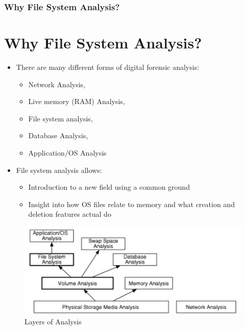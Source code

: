 \documentclass{beamer}
\begin{document}
\begin{frame}[allowframebreaks]
	\frametitle{Why File System Analysis?}
	\section{Why File System Analysis?}
	\begin{itemize}
		\item There are many different forms of digital forensic analysis:
			\begin{itemize}
				\item Network Analysis,
				\item Live memory (RAM) Analysis, 
				\item File system analysis, 
				\item Database Analysis,
				\item Application/OS Analysis
			\end{itemize}
			\item File system analysis allows:
			\begin{itemize}
				\item Introduction to a new field using a common ground
				\item Insight into how OS files relate to memory and what creation and deletion features actual do
			\end{itemize}
	\end{itemize}
	\begin{figure}
		\includegraphics[scale=0.3]{digital-data-analysis-layers-BrianCarrier}
		\caption{Layers of Analysis}
	\end{figure}
\end{frame}
\end{document}
